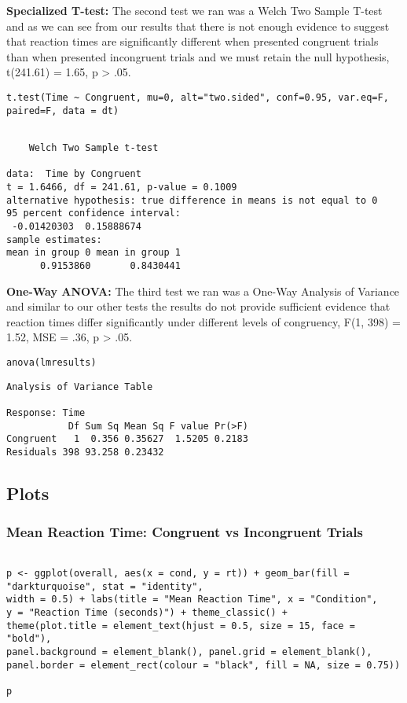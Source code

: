 \documentclass{article}
\begin{document}
\vspace{2em} \textbf{Specialized T-test:} The second test we ran was a Welch Two Sample T-test and as we can see from our results that there is not enough evidence to suggest that reaction times are significantly different when presented congruent trials than when presented incongruent trials and we must retain the null hypothesis, t(241.61) = 1.65, p > .05.
\begin{verbatim}
t.test(Time ~ Congruent, mu=0, alt="two.sided", conf=0.95, var.eq=F, paired=F, data = dt)
\end{verbatim}

\begin{verbatim}

	Welch Two Sample t-test

data:  Time by Congruent
t = 1.6466, df = 241.61, p-value = 0.1009
alternative hypothesis: true difference in means is not equal to 0
95 percent confidence interval:
 -0.01420303  0.15888674
sample estimates:
mean in group 0 mean in group 1 
      0.9153860       0.8430441
\end{verbatim}

\vspace{2em} \textbf{One-Way ANOVA:} The third test we ran was a One-Way Analysis of Variance and similar to our other tests the results do not provide sufficient evidence that reaction times differ significantly under different levels of congruency, F(1, 398) = 1.52, MSE = .36, p > .05.
\begin{verbatim}
anova(lmresults)
\end{verbatim}

\begin{verbatim}
Analysis of Variance Table

Response: Time
           Df Sum Sq Mean Sq F value Pr(>F)
Congruent   1  0.356 0.35627  1.5205 0.2183
Residuals 398 93.258 0.23432
\end{verbatim}

\subsection{Plots}
\label{sec:orgf12f48b}
\subsubsection{Mean Reaction Time: Congruent vs Incongruent Trials}
\label{sec:org0976132}
\begin{verbatim}

p <- ggplot(overall, aes(x = cond, y = rt)) + geom_bar(fill = "darkturquoise", stat = "identity", 
width = 0.5) + labs(title = "Mean Reaction Time", x = "Condition", 
y = "Reaction Time (seconds)") + theme_classic() + 
theme(plot.title = element_text(hjust = 0.5, size = 15, face = "bold"), 
panel.background = element_blank(), panel.grid = element_blank(), 
panel.border = element_rect(colour = "black", fill = NA, size = 0.75))

p
\end{verbatim}
\end{document}
